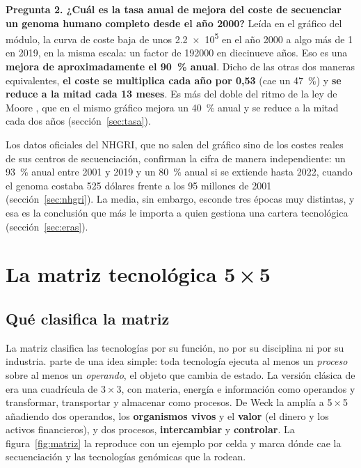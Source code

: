 \documentclass[11pt,letterpaper]{article}
\begin{document}
\textbf{Pregunta 2. ¿Cuál es la tasa anual de mejora del coste de secuenciar un
genoma humano completo desde el año 2000?} Leída en el gráfico del módulo, la
curva de coste baja de unos \num{2,2e5} en el año 2000 a algo más de 1 en
2019, en la misma escala: un factor de \num{192000} en diecinueve años. Eso es
una \textbf{mejora de aproximadamente el 90~\% anual}. Dicho de las otras dos
maneras equivalentes, \textbf{el coste se multiplica cada año por 0,53} (cae un
47~\%) y \textbf{se reduce a la mitad cada 13 meses}. Es más del doble del
ritmo de la ley de Moore \parencite{moore1965}, que en el mismo gráfico mejora un 40~\% anual y se
reduce a la mitad cada dos años (sección~\ref{sec:tasa}).

Los datos oficiales del NHGRI, que no salen del gráfico sino de los costes
reales de sus centros de secuenciación, confirman la cifra de manera
independiente: un 93~\% anual entre 2001 y 2019 y un 80~\% anual si se extiende
hasta 2022, cuando el genoma costaba 525 dólares frente a los 95 millones de
2001 (sección~\ref{sec:nhgri}). La media, sin embargo, esconde tres épocas muy
distintas, y esa es la conclusión que más le importa a quien gestiona una
cartera tecnológica (sección~\ref{sec:eras}).

\section{\texorpdfstring{La matriz tecnológica 5\,×\,5}{La matriz tecnológica 5 × 5}}
\label{sec:matriz}

\subsection*{Qué clasifica la matriz}

La matriz clasifica las tecnologías por su función, no por su disciplina ni por
su industria. \textcite{deweck2022} parte de una idea simple: toda tecnología
ejecuta al menos un \emph{proceso} sobre al menos un \emph{operando}, el objeto
que cambia de estado. La versión clásica de \textcite{vanwyk1988} era una
cuadrícula de 3\,×\,3, con materia, energía e información como operandos y
transformar, transportar y almacenar como procesos. De Weck la amplía a
5\,×\,5 añadiendo dos operandos, los \textbf{organismos vivos} y el
\textbf{valor} (el dinero y los activos financieros), y dos procesos,
\textbf{intercambiar} y \textbf{controlar}. La figura~\ref{fig:matriz} la
reproduce con un ejemplo por celda y marca dónde cae la secuenciación y las
tecnologías genómicas que la rodean.
\end{document}
